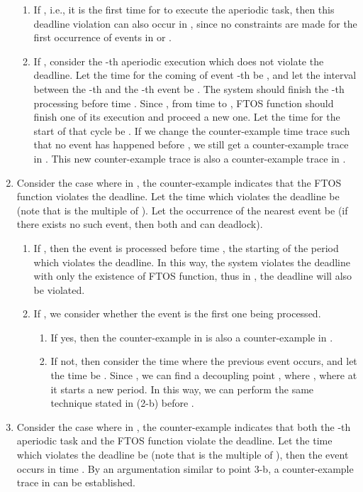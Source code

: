 \documentclass[10pt, a4paper, onecolumn, conference, compsocconf]{IEEEtran}
\begin{document}
\begin{IEEEproof}
\begin{enumerate}
\begin{figure}
\end{figure}
        \begin{enumerate}
            \item If , i.e., it is the first time for  to execute the aperiodic task, then this deadline violation can also occur in , since no constraints are made for the first
                occurrence of events in  or .
            \item If , consider the -th aperiodic execution which does not violate the deadline. Let the time for the coming of event -th be , and let the interval between the -th
                  and the -th event be .  The system should finish the -th processing before time . Since , from time  to , FTOS function should finish one of its execution and proceed a new one. Let the time for the start of that cycle be . If we change the counter-example time trace such that no event has happened before , we still get a counter-example trace in . This new counter-example trace is also a counter-example trace in .
        \end{enumerate}
    \item Consider the case where in , the counter-example indicates that the FTOS function violates the deadline. Let the time which violates the deadline be  (note that  is the multiple of ). Let the occurrence of the nearest event be  (if there exists no such event, then both  and  can deadlock).
          \begin{enumerate}
            \item  If , then the event is processed before time , the starting of the period which violates the deadline. In this way, the system violates the deadline with only the existence of FTOS function, thus in , the deadline will also be violated.
            \item  If , we consider whether the event is the first one being processed.
            \begin{enumerate}
            \item If yes, then the counter-example in  is also a counter-example in .
            \item If not, then consider the time where the previous event occurs, and let the time be . Since , we can find a decoupling point , where , where at  it starts a new period.
                In this way, we can perform the same technique stated in (2-b) before .
            \end{enumerate}
          \end{enumerate}
    \item Consider the case where in , the counter-example indicates that both the -th aperiodic task and the FTOS function violate the deadline.
          Let the time which violates the deadline be  (note that  is the multiple of ), then the event occurs in time . By an argumentation similar to point 3-b, a counter-example trace in  can be established.
\end{enumerate}

\end{IEEEproof}
\end{document}
